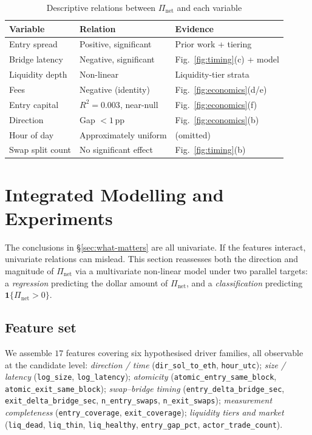 \documentclass[sigconf,nonacm,10pt]{acmart}
\newcommand{\Pnet}{\Pi_{\text{net}}}
\begin{document}
\begin{table}[h]
  \centering
  \small
  \caption{Descriptive relations between $\Pnet$ and each variable}
  \label{tab:univar}
  \begin{tabular}{lll}
    \toprule
    \textbf{Variable} & \textbf{Relation} & \textbf{Evidence} \\
    \midrule
    Entry spread     & Positive, significant     & Prior work + tiering \\
    Bridge latency   & Negative, significant     & Fig.~\ref{fig:timing}(c) + model \\
    Liquidity depth  & Non-linear                & Liquidity-tier strata \\
    Fees             & Negative (identity)       & Fig.~\ref{fig:economics}(d/e) \\
    Entry capital    & $R^2\!=\!0.003$, near-null & Fig.~\ref{fig:economics}(f) \\
    Direction        & Gap $<\!1$\,pp             & Fig.~\ref{fig:economics}(b) \\
    Hour of day      & Approximately uniform     & (omitted) \\
    Swap split count & No significant effect     & Fig.~\ref{fig:timing}(b) \\
    \bottomrule
  \end{tabular}
\end{table}

\section{Integrated Modelling and Experiments}
\label{sec:model}

The conclusions in \S\ref{sec:what-matters} are all univariate. If the
features interact, univariate relations can mislead. This section
reassesses both the direction and magnitude of $\Pnet$ via a
multivariate non-linear model under two parallel targets:
a \emph{regression} predicting the dollar amount of $\Pnet$, and a
\emph{classification} predicting $\mathbf{1}\{\Pnet>0\}$.

\subsection{Feature set}
\label{sec:features}

We assemble $17$ features covering six hypothesised driver families,
all observable at the candidate level:
\emph{direction / time} (\texttt{dir\_sol\_to\_eth}, \texttt{hour\_utc});
\emph{size / latency} (\texttt{log\_size}, \texttt{log\_latency});
\emph{atomicity} (\texttt{atomic\_entry\_same\_block},
\texttt{atomic\_exit\_same\_block});
\emph{swap--bridge timing} (\texttt{entry\_delta\_bridge\_sec},
\texttt{exit\_delta\_bridge\_sec},
\texttt{n\_entry\_swaps}, \texttt{n\_exit\_swaps});
\emph{measurement completeness} (\texttt{entry\_coverage},
\texttt{exit\_coverage});
\emph{liquidity tiers and market} (\texttt{liq\_dead},
\texttt{liq\_thin}, \texttt{liq\_healthy}, \texttt{entry\_gap\_pct},
\texttt{actor\_trade\_count}).
\end{document}
